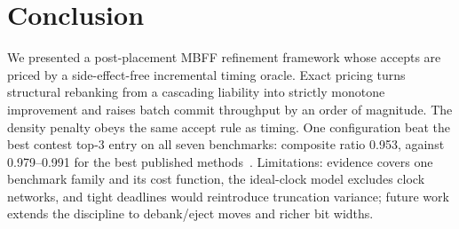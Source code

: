 \section{Conclusion}

 We presented a post-placement MBFF refinement framework whose accepts are priced by a side-effect-free incremental timing oracle. Exact pricing turns structural rebanking from a cascading liability into strictly monotone improvement and raises batch commit throughput by an order of magnitude. The density penalty obeys the same accept rule as timing. One configuration beat the best contest top-3 entry on all seven benchmarks: composite ratio 0.953, against 0.979--0.991 for the best published methods~\cite{li2025lbr,chen2026agile}. Limitations: evidence covers one benchmark family and its cost function, the ideal-clock model excludes clock networks, and tight deadlines would reintroduce truncation variance; future work extends the discipline to debank/eject moves and richer bit widths.
